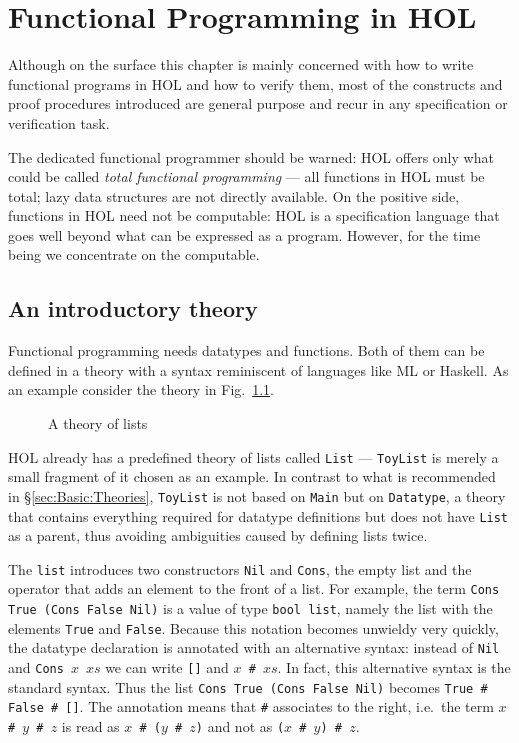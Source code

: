 \chapter{Functional Programming in HOL}

Although on the surface this chapter is mainly concerned with how to write
functional programs in HOL and how to verify them, most of the
constructs and proof procedures introduced are general purpose and recur in
any specification or verification task.

The dedicated functional programmer should be warned: HOL offers only what
could be called {\em total functional programming} --- all functions in HOL
must be total; lazy data structures are not directly available. On the
positive side, functions in HOL need not be computable: HOL is a
specification language that goes well beyond what can be expressed as a
program. However, for the time being we concentrate on the computable.

\section{An introductory theory}
\label{sec:intro-theory}

Functional programming needs datatypes and functions. Both of them can be
defined in a theory with a syntax reminiscent of languages like ML or
Haskell. As an example consider the theory in Fig.~\ref{fig:ToyList}.

\begin{figure}[htbp]
\begin{ttbox}\makeatother
\end{ttbox}
\caption{A theory of lists}
\label{fig:ToyList}
\end{figure}

HOL already has a predefined theory of lists called \texttt{List} ---
\texttt{ToyList} is merely a small fragment of it chosen as an example. In
contrast to what is recommended in \S\ref{sec:Basic:Theories},
\texttt{ToyList} is not based on \texttt{Main} but on \texttt{Datatype}, a
theory that contains everything required for datatype definitions but does
not have \texttt{List} as a parent, thus avoiding ambiguities caused by
defining lists twice.

The  \texttt{list} introduces two constructors
\texttt{Nil} and \texttt{Cons}, the empty list and the operator that adds an
element to the front of a list. For example, the term \texttt{Cons True (Cons
  False Nil)} is a value of type \texttt{bool~list}, namely the list with the
elements \texttt{True} and \texttt{False}. Because this notation becomes
unwieldy very quickly, the datatype declaration is annotated with an
alternative syntax: instead of \texttt{Nil} and \texttt{Cons}~$x$~$xs$ we can
write \texttt{[]} and
\texttt{$x$~\#~$xs$}. In fact, this alternative syntax
is the standard syntax. Thus the list \texttt{Cons True (Cons False Nil)}
becomes \texttt{True \# False \# []}. The annotation 
means that \texttt{\#} associates to the right, i.e.\ the term \texttt{$x$ \#
  $y$ \# $z$} is read as \texttt{$x$ \# ($y$ \# $z$)} and not as \texttt{($x$
  \# $y$) \# $z$}.

